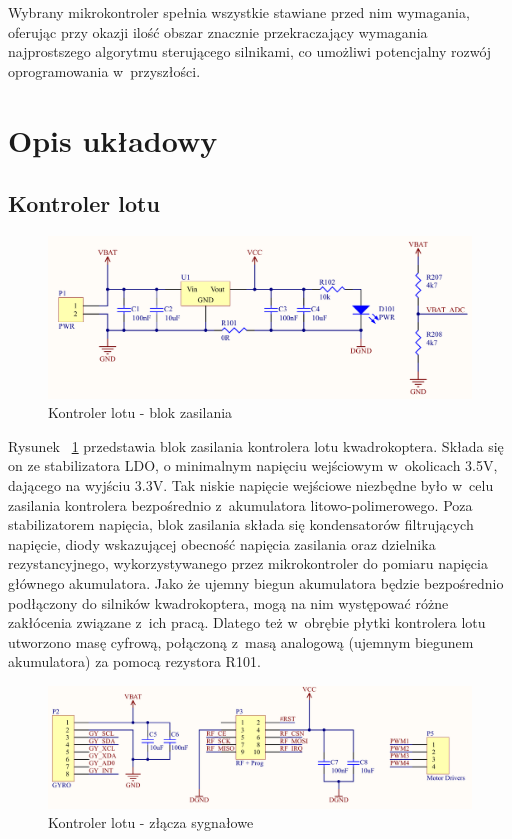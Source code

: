 Wybrany mikrokontroler spełnia wszystkie stawiane przed nim wymagania, oferując przy okazji ilość obszar znacznie przekraczający wymagania najprostszego algorytmu sterującego silnikami, co umożliwi potencjalny rozwój oprogramowania w~przyszłości.

\section{Opis układowy}

\subsection{Kontroler lotu}

\begin{figure}[H]
	\centering
	\includegraphics[scale=0.4]{Pictures/QuadroController_PWR_C.png}
		\caption[Kontroler lotu - blok zasilania]{Kontroler lotu - blok zasilania}
	\label{fig:QuadroControllerPWR}
\end{figure}

Rysunek ~\ref{fig:QuadroControllerPWR} przedstawia blok zasilania kontrolera lotu kwadrokoptera. Składa się on ze stabilizatora LDO, o minimalnym napięciu wejściowym w~okolicach 3.5V, dającego na wyjściu 3.3V. Tak niskie napięcie wejściowe niezbędne było w~celu zasilania kontrolera bezpośrednio z~akumulatora litowo-polimerowego. Poza stabilizatorem napięcia, blok zasilania składa się kondensatorów filtrujących napięcie, diody wskazującej obecność napięcia zasilania oraz dzielnika rezystancyjnego, wykorzystywanego przez mikrokontroler do pomiaru napięcia głównego akumulatora. Jako że ujemny biegun akumulatora będzie bezpośrednio podłączony do silników kwadrokoptera, mogą na nim występować różne zakłócenia związane z~ich pracą. Dlatego też w~obrębie płytki kontrolera lotu utworzono masę cyfrową, połączoną z~masą analogową (ujemnym biegunem akumulatora) za pomocą rezystora R101.

\begin{figure}[H]
	\centering
	\includegraphics[scale=0.36]{Pictures/QuadroController_Connector_C.png}
		\caption[Kontroler lotu - złącza sygnałowe]{Kontroler lotu - złącza sygnałowe}
	\label{fig:QuadrotorControllerConnectors}
\end{figure}

